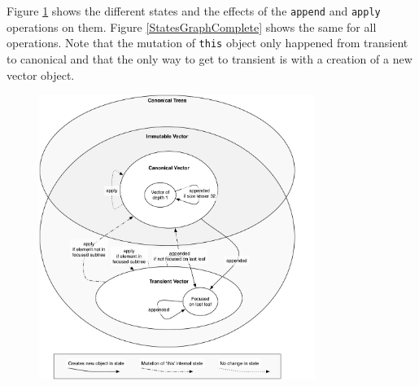 Figure \ref{StatesGraphSimple} shows the different states and the effects of the \texttt{append} and \texttt{apply} operations on them. Figure \ref{StatesGraphComplete} shows the same for all operations. Note that the mutation of \texttt{this} object only happened from transient to canonical and that the only way to get to transient is with a creation of a new vector object.

\begin{figure}[h!]
  \centering
  \includegraphics[width=0.8\textwidth]{Figures/StatesGraphSimple}
  \caption{}
  \label{StatesGraphSimple}
\end{figure}


